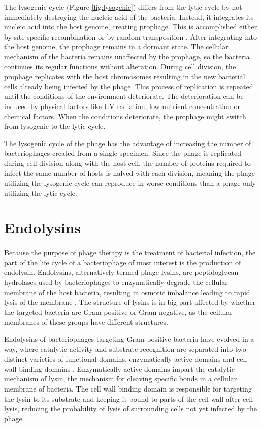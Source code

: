 The lysogenic cycle (Figure \ref{fig:lysogenic}) differs from the lytic cycle by not immediately destroying the nucleic acid of the bacteria. Instead, it integrates its nucleic acid into the host genome, creating prophage. This is accomplished either by site-specific recombination or by random transposition \cite{guttman2005basic}. After integrating into the host genome, the prophage remains in a dormant state. The cellular mechanism of the bacteria remains unaffected by the prophage, so the bacteria continues its regular functions without alteration. During cell division, the prophage replicates with the host chromosomes resulting in the new bacterial cells already being infected by the phage. This process of replication is repeated until the conditions of the environment deteriorate. The deterioration can be induced by physical factors like UV radiation, low nutrient concentration or chemical factors. When the conditions deteriorate, the prophage might switch from lysogenic to the lytic cycle. 

The lysogenic cycle of the phage has the advantage of increasing the number of bacteriophages created from a single specimen. Since the phage is replicated during cell division along with the host cell, the number of proteins required to infect the same number of hosts is halved with each division, meaning the phage utilizing the lysogenic cycle can reproduce in worse conditions than a phage only utilizing the lytic cycle.


\section{Endolysins}
\paragraph*{}
Because the purpose of phage therapy is the treatment of bacterial infection, the part of the life cycle of a bacteriophage of most interest is the production of endolysin. Endolysins, alternatively termed phage lysins, are peptidoglycan hydrolases used by bacteriophages to enzymatically degrade the cellular membrane of the host bacteria, resulting in osmotic imbalance leading to rapid lysis of the membrane \cite{schmelcher2012bacteriophage}. The structure of lysins is in big part affected by whether the targeted bacteria are Gram-positive or Gram-negative, as the cellular membranes of these groups have different structures. 

Endolysins of bacteriophages targeting Gram-positive bacteria have evolved in a way, where catalytic activity and substrate recognition are separated into two distinct varieties of functional domains, enzymatically active domains and cell wall binding domains \cite{schmelcher2012bacteriophage}. Enzymatically active domains impart the catalytic mechanism of lysin, the mechanism for cleaving specific bonds in a cellular membrane of bacteria. The cell wall binding domain is responsible for targeting the lysin to its substrate and keeping it bound to parts of the cell wall after cell lysis, reducing the probability of lysis of surrounding cells not yet infected by the phage.

